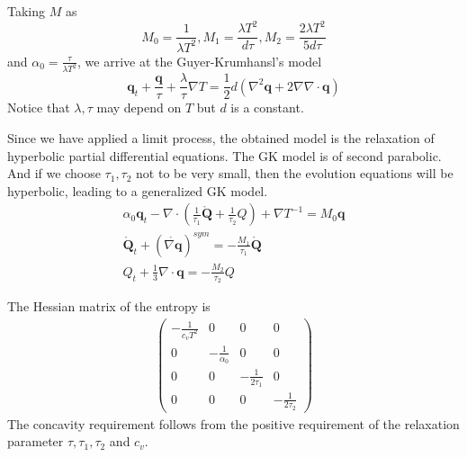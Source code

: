 \documentclass[a4paper]{article}
\begin{document}
Taking $M$ as
\begin{equation}
M_0=\frac{1}{\lambda T^2}, M_1=\frac{\lambda T^2}{d\tau}, M_2=\frac{2\lambda T^2}{5d\tau}
\end{equation}
and $\alpha_0=\frac{\tau}{\lambda T^2}$,
we arrive at the Guyer-Krumhansl's model \cite{Jou1996extended}
\begin{equation}
\mathbf{q}_t+\frac{\mathbf{q}}{\tau}+\frac{\lambda}{\tau}\nabla T=\frac{1}{2}d(\nabla^2 \mathbf{q}+2\nabla \nabla \cdot \mathbf{q})
\end{equation}
Notice that $\lambda, \tau$ may depend on $T$ but $d$ is a constant.

Since we have applied a limit process, the obtained model is the relaxation of hyperbolic partial differential equations. The GK model is of second parabolic. And if we choose $\tau_1,\tau_2$ not to be very small, then the evolution equations will be hyperbolic, leading to a generalized GK model.
\begin{eqnarray}
\alpha_0 \mathbf{q}_t - \nabla \cdot ({\frac{1}{\tau_1} \mathring{\mathbf{Q}}}+\frac{1}{\tau_2}Q)+\nabla T^{-1} = M_0 \mathbf{q} \\
\mathring{\mathbf{Q}}_t+(\mathring{\nabla \mathbf{q}})^{sym}=-\frac{M_1}{\tau_1}\mathring{\mathbf{Q}} \\
Q_t+\frac{1}{3} \nabla \cdot \mathbf{q}=-\frac{M_2}{\tau_2}Q
\end{eqnarray}

The Hessian matrix of the entropy is 
\begin{eqnarray}
\left(\begin{array}{llll}  -\frac{1}{c_v T^2} & 0 & 0 & 0 \\
                                           0  & -\frac{1}{\alpha_0} & 0 & 0 \\
										   0 & 0 & -\frac{1}{2\tau_1} & 0 \\
										   0 & 0 & 0 & -\frac{1}{2\tau_2}
										   \end{array} \right)
\end{eqnarray}
The concavity requirement follows from the positive requirement of the relaxation parameter $\tau,\tau_1,\tau_2$ and $c_v$.
\end{document}
